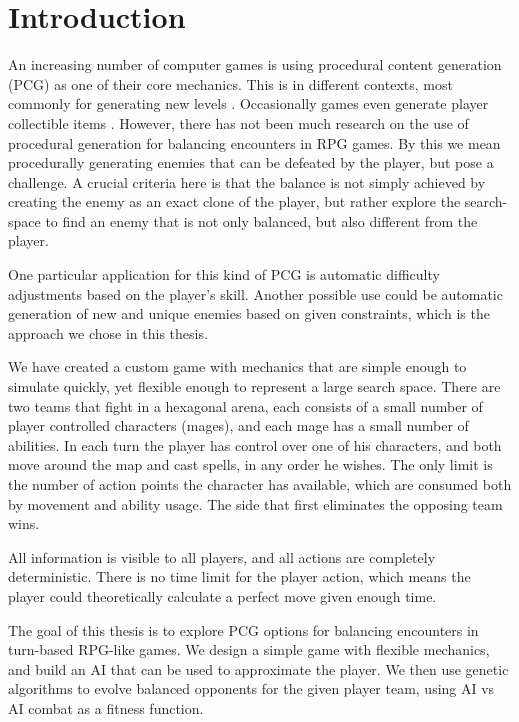 \chapter*{Introduction}

An increasing number of computer games is using procedural content generation
(PCG) as one of their core mechanics. This is in different contexts, most
commonly for generating new levels . Occasionally games
even generate player collectible items . However,
there has not been much research on the use of procedural generation for
balancing encounters in RPG games. By this we mean procedurally generating
enemies that can be defeated by the player, but pose a challenge. A crucial
criteria here is that the balance is not simply achieved by creating the enemy
as an exact clone of the player, but rather explore the search-space to find an
enemy that is not only balanced, but also different from the player.

One particular application for this kind of PCG is automatic difficulty
adjustments based on the player's skill. Another possible use could be
automatic generation of new and unique enemies based on given constraints,
which is the approach we chose in this thesis.

We have created a custom game with mechanics that are simple enough to simulate
quickly, yet flexible enough to represent a large search space. There are two
teams that fight in a hexagonal arena, each consists of a small number of
player controlled characters (mages), and each mage has a small number of
abilities. In each turn the player has control over one of his characters, and
both move around the map and cast spells, in any order he wishes. The only
limit is the number of action points the character has available, which are
consumed both by movement and ability usage. The side that first eliminates the
opposing team wins.

All information is visible to all players, and all actions are completely
deterministic. There is no time limit for the player action, which means the
player could theoretically calculate a perfect move given enough time.

The goal of this thesis is to explore PCG options for balancing encounters in
turn-based RPG-like games. We design a simple game with flexible mechanics, and
build an AI that can be used to approximate the player. We then use genetic
algorithms to evolve balanced opponents for the given player team, using AI vs
AI combat as a fitness function.

